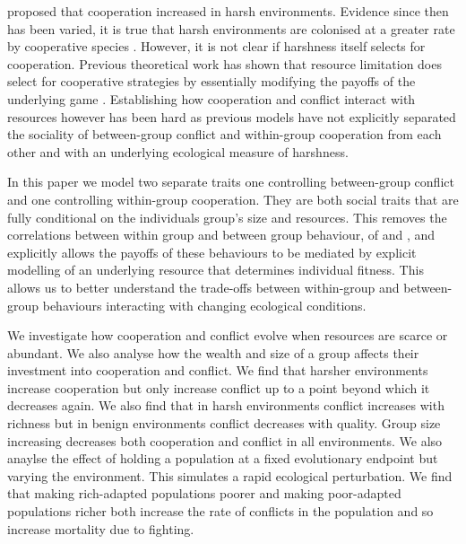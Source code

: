  proposed that cooperation increased in harsh environments. Evidence since then has been varied, it is true that harsh environments are colonised at a greater rate by cooperative species \citep{cornwallisCooperationFacilitates2017}. However, it is not clear if harshness itself selects for cooperation. Previous theoretical work has shown that resource limitation does select for cooperative strategies by essentially modifying the payoffs of the underlying game \citep{requejoEvolutionCooperation2011,smaldinoIncreasedCosts2013}. Establishing how cooperation and conflict interact with resources however has been hard as previous models have not explicitly separated the sociality of between-group conflict and within-group cooperation from each other and with an underlying ecological measure of harshness. 

In this paper we model two separate traits one controlling between-group conflict and one controlling within-group cooperation. They are both social traits that are fully conditional on the individuals group's size and resources. This removes the correlations between within group and between group behaviour, of \citet{choiCoevolutionParochial2007} and \citet{lehmannWarEvolution2008}, and explicitly allows the payoffs of these behaviours to be mediated by explicit modelling of an underlying resource that determines individual fitness. This allows us to better understand the trade-offs between within-group and between-group behaviours interacting with changing ecological conditions.

We investigate how cooperation and conflict evolve when resources are scarce or abundant. We also analyse how the wealth and size of a group affects their investment into cooperation and conflict. We find that harsher environments increase cooperation but only increase conflict up to a point beyond which it decreases again. We also find that in harsh environments conflict increases with richness but in benign environments conflict decreases with quality. Group size increasing decreases both cooperation and conflict in all environments. We also anaylse the effect of holding a population at a fixed evolutionary endpoint but varying the environment. This simulates a rapid ecological perturbation. We find that making rich-adapted populations poorer and making poor-adapted populations richer both increase the rate of conflicts in the population and so increase mortality due to fighting. 